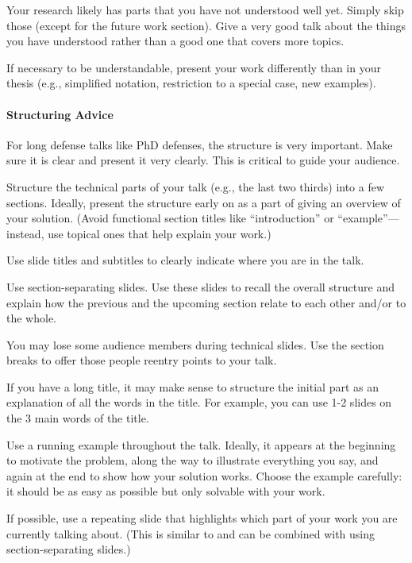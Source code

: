 \documentclass[12pt]{article}
\begin{document}
Your research likely has parts that you have not understood well yet.
Simply skip those (except for the future work section).
Give a very good talk about the things you have understood rather than a good one that covers more topics.

If necessary to be understandable, present your work differently than in your thesis (e.g., simplified notation, restriction to a special case, new examples).

\paragraph{Structuring Advice}
For long defense talks like PhD defenses, the structure is very important.
Make sure it is clear and present it very clearly.
This is critical to guide your audience.
\begin{compactitem}
\item Structure the technical parts of your talk (e.g., the last two thirds) into a few sections.
 Ideally, present the structure early on as a part of giving an overview of your solution.
 (Avoid functional section titles like ``introduction'' or ``example''---instead, use topical ones that help explain your work.)
\item Use slide titles and subtitles to clearly indicate where you are in the talk. 
\item Use section-separating slides. Use these slides to recall the overall structure and explain how the previous and the upcoming section relate to each other and/or to the whole.
\item You may lose some audience members during technical slides. Use the section breaks to offer those people reentry points to your talk.
\end{compactitem}
\medskip

If you have a long title, it may make sense to structure the initial part as an explanation of all the words in the title.
For example, you can use 1-2 slides on the 3 main words of the title.
\medskip

Use a running example throughout the talk.
Ideally, it appears at the beginning to motivate the problem, along the way to illustrate everything you say, and again at the end to show how your solution works.
Choose the example carefully: it should be as easy as possible but only solvable with your work.
\medskip

If possible, use a repeating slide that highlights which part of your work you are currently talking about.
(This is similar to and can be combined with using section-separating slides.)
\end{document}
